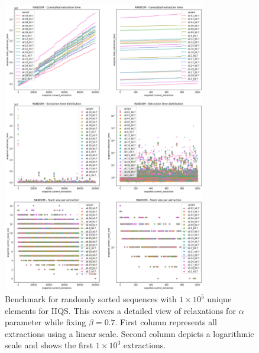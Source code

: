 \begin{figure}[!ht]
    \centering
    \includegraphics[width=0.79\textwidth]{./fragments/04_experimental_execution/images/04_alphabeta_detail_random_left.png}
    \caption{Benchmark for randomly sorted sequences with $1\times10^5$ unique elements for IIQS. This covers a detailed view of relaxations for $\alpha$ parameter while fixing $\beta=0.7$. First column represents all extractions using a linear scale. Second column depicts a logarithmic scale and shows the first $1\times10^3$ extractions. }
    \label{FIG:05_ALPHABETA_BENCHMARK_RANDOM_LEFT}
\end{figure}

